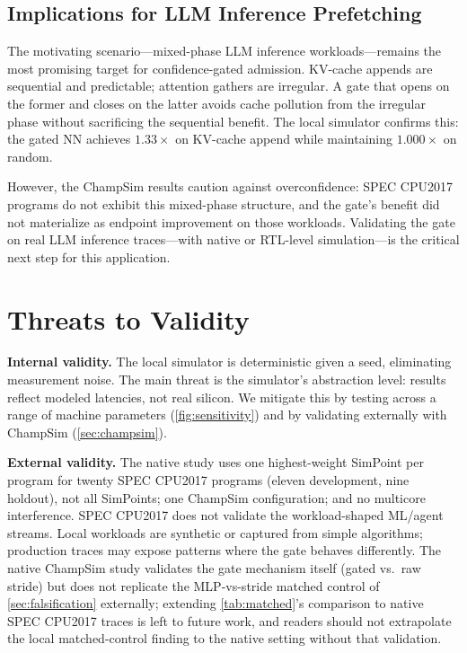 \documentclass[conference]{IEEEtran}
\begin{document}
\subsection{Implications for LLM Inference Prefetching}

The motivating scenario---mixed-phase LLM inference workloads---remains
the most promising target for confidence-gated admission. KV-cache appends
are sequential and predictable; attention gathers are irregular. A gate
that opens on the former and closes on the latter avoids cache pollution
from the irregular phase without sacrificing the sequential benefit. The
local simulator confirms this: the gated NN achieves $1.33\times$ on
KV-cache append while maintaining $1.000\times$ on random.

However, the ChampSim results caution against overconfidence: SPEC CPU2017
programs do not exhibit this mixed-phase structure, and the gate's benefit
did not materialize as endpoint improvement on those workloads. Validating
the gate on real LLM inference traces---with native or RTL-level
simulation---is the critical next step for this application.

\section{Threats to Validity}
\label{sec:threats}

\textbf{Internal validity.} The local simulator is deterministic given a
seed, eliminating measurement noise. The main threat is the simulator's
abstraction level: results reflect modeled latencies, not real silicon. We
mitigate this by testing across a range of machine parameters
(\cref{fig:sensitivity}) and by validating externally with
ChampSim (\cref{sec:champsim}).

\textbf{External validity.} The native study uses one highest-weight
SimPoint per program for twenty SPEC CPU2017 programs (eleven development,
nine holdout), not all SimPoints; one ChampSim configuration; and no
multicore interference. SPEC CPU2017 does not validate the workload-shaped
ML/agent streams. Local workloads are synthetic or captured from simple
algorithms; production traces may expose patterns where the gate behaves
differently.
The native ChampSim study validates the gate mechanism itself (gated vs.\
raw stride) but does not replicate the MLP-vs-stride matched control of
\cref{sec:falsification} externally; extending \cref{tab:matched}'s
comparison to native SPEC CPU2017 traces is left to future work, and
readers should not extrapolate the local matched-control finding to the
native setting without that validation.
\end{document}
